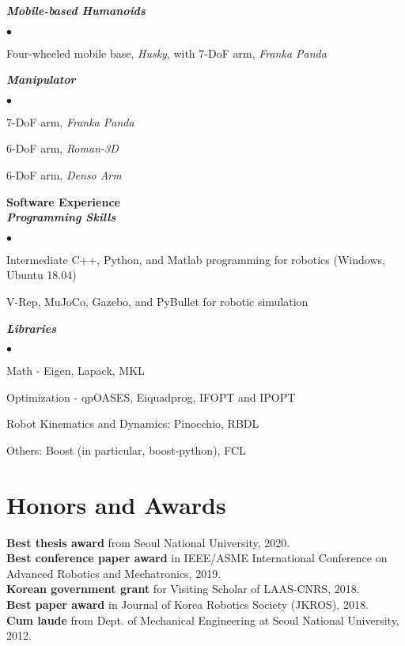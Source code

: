 \documentclass[margin,line]{res}
\newenvironment{list2}{
  \begin{list}{$\bullet$}{%
      \setlength{\itemsep}{0in}
      \setlength{\parsep}{0in} \setlength{\parskip}{0in}
      \setlength{\topsep}{0in} \setlength{\partopsep}{0in} 
      \setlength{\leftmargin}{0.2in}}}{\end{list}}
\begin{document}
\begin{resume}
  \textbf{\emph { Mobile-based Humanoids}}
  \begin{list2}
    \item Four-wheeled mobile base, \textit{Husky}, with 7-DoF arm, \textit{Franka Panda}
  \end{list2}
  \vspace{-0.3cm}

  \textbf{\emph { Manipulator}}
  \begin{list2}
    \item 7-DoF arm, \textit{Franka Panda}
    \item 6-DoF arm, \textit{Roman-3D}
    \item 6-DoF arm, \textit{Denso Arm}
  \end{list2}
  {\bf Software Experience} \\
  \textbf{\emph { Programming Skills}}
  \begin{list2}
    \item Intermediate C++, Python, and Matlab programming for robotics (Windows, Ubuntu 18.04)
    \item V-Rep, MuJoCo, Gazebo, and PyBullet for robotic simulation
  \end{list2}
  \vspace{-0.3cm}
  \textbf{\emph { Libraries}}
  \begin{list2}
    \item Math - Eigen, Lapack, MKL
    \item Optimization - qpOASES, Eiquadprog, IFOPT and IPOPT
    \item Robot Kinematics and Dynamics: Pinocchio, RBDL
    \item Others: Boost (in particular, boost-python), FCL
  \end{list2}

  \section{\sc Honors and Awards}
  \textbf{Best thesis award} from Seoul National University, 2020.\\
  \textbf{Best conference paper award} in IEEE/ASME International Conference on Advanced Robotics and Mechatronics, 2019.\\
  \textbf{Korean government grant} for Visiting Scholar of LAAS-CNRS, 2018. \\
  \textbf{Best paper award} in Journal of Korea Robotics Society (JKROS), 2018.\\
  \textbf{Cum laude} from Dept. of Mechanical Engineering at Seoul National University, 2012.



\end{resume}
\end{document}
